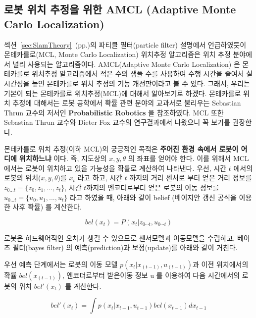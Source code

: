\subsection{로봇 위치 추정을 위한 AMCL (Adaptive Monte Carlo Localization)}

섹션~\ref{sec:SlamTheory}~(pp.\pageref{sec:SlamTheory})의 파티클 필터(particle filter) 설명에서 언급하였듯이 몬테카를로(MCL, Monte Carlo Localization) 위치추정 알고리즘은 위치 추정 분야에서 널리 사용되는 알고리즘이다. AMCL(Adaptive Monte Carlo Localization) 은 몬테카를로 위치추정 알고리즘에서 적은 수의 샘플 수를 사용하여 수행 시간을 줄여서 실시간성을 높인 몬테카를로 위치 추정의 기능 개선판이라고 볼 수 있다. 그래서, 우리는 기본이 되는 몬테카를로 위치추정(MCL)에 대해서 알아보기로 하겠다. 몬테카를로 위치 추정에 대해서는 로봇 공학에서 확률 관련 분야의 교과서로 불리우는 Sebastian Thrun 교수의 저서인 \textbf{Probabilistic Robotics}\cite{thrun2005probabilistic} 을 참조하였다. MCL 또한 Sebastian Thrun 교수와 Dieter Fox 교수의 연구결과\cite{fox1999monte}\cite{dellaert1999monte}에서 나왔으니 꼭 보기를 권장한다.

몬테카를로 위치 추정(이하 MCL)의 궁긍적인 목적은 \textbf{주어진 환경 속에서 로봇이 어디에 위치하느냐} 이다. 즉, 지도상의 $x, y, \theta$ 의 좌표를 얻어야 한다. 이를 위해서 MCL 에서는 로봇이 위치하고 있을 가능성을 확률로 계산하여 나타낸다. 우선, 시간 $t$ 에서의 로봇의 위치($x, y, \theta$)를  $x_t$ 라고 하고, 시간 $t$ 까지의 거리 센서로 부터 얻은 거리 정보를 $z_{0...t} = \{z_0, z_1, ..., z_t\}$, 시간 $t$까지의 엔코더로부터 얻은 로봇의 이동 정보를 $u_{0...t} = \{u_0, u_1, ..., u_t\}$ 라고 하였을 때, 아래와 같이 belief (베이지안 갱신 공식을 이용한 사후 확률) 를 계산한다.

\begin{equation}
  bel(x_t) = P(x_t|z_{0\cdots t},u_{0\cdots t})
\end{equation}

로봇은 하드웨어적인 오차가 생길 수 있으므로 센서모델과 이동모델을 수립하고, 베이즈 필터(bayes filter) 의  예측(prediction)과 보정(update)를 아래와 같이 거친다. 

우선 예측 단계에서는 로봇의 이동 모델 $p( x_t | x_{(t-1)}, u_{(t-1)} )$과 이전 위치에서의 확률 $bel(x_{(t-1)})$, 엔코더로부터 받은이동 정보 u 를 이용하여 다음 시간에서의 로봇의 위치 $bel'(x_t)$ 를 계산한다.

\begin{equation}
  bel'(x_t) = \int p(x_t | x_{t-1},u_{t-1})bel(x_{t-1})dx_{t-1}
\end{equation}

